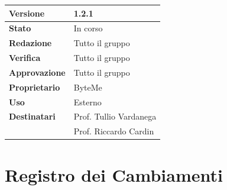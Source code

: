 \documentclass[11pt,a4paper]{article}
\begin{document}
\begin{titlepage}
    \begin{table}[H]
        \centering
        \begin{tabular}{|l|p{5cm}|}
            \hline
            \textbf{Versione} & 1.2.1 \\
            \hline
            \textbf{Stato} & In corso \\
            \hline
            \textbf{Redazione} & Tutto il gruppo \\
            \hline
            \textbf{Verifica} & Tutto il gruppo \\
            \hline
            \textbf{Approvazione} & Tutto il gruppo \\
            \hline
            \textbf{Proprietario} & ByteMe \\
            \hline
            \textbf{Uso} & Esterno \\
            \hline
            \textbf{Destinatari} & Prof. Tullio Vardanega \\ & Prof. Riccardo Cardin \\
            \hline
        \end{tabular}
    \end{table}
    
    \vfill
\end{titlepage}

\thispagestyle{empty}
\section*{Registro dei Cambiamenti}
\end{document}
